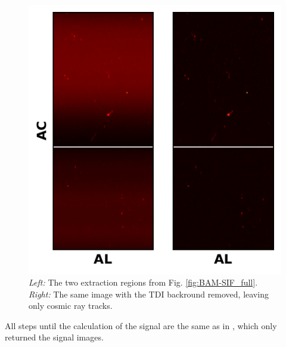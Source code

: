 \documentclass[a4paper, 11pt]{article}
\begin{document}
\begin{figure}
  \centering
  \includegraphics{images/extraction/BAM-SIF_background}
  \caption{\textit{Left:} The two extraction regions from Fig. \ref{fig:BAM-SIF_full}. \textit{Right:} The same image with the TDI backround removed, leaving only cosmic ray tracks.}
  \label{fig:BAM-SIF_background}
\end{figure}

All steps until the calculation of the signal are the same as in \cite{GAIA-DE-TN-ESAC-RKO-033}, which only returned the signal images.
\end{document}
